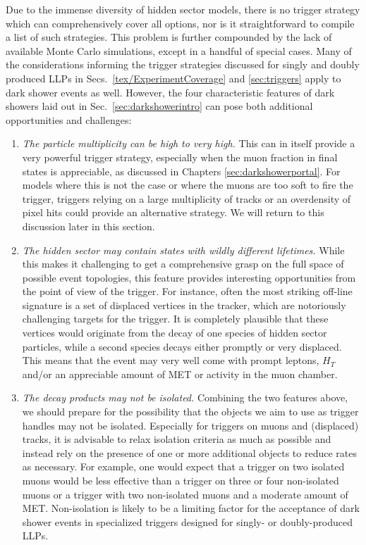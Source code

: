 Due to the immense diversity of hidden sector models, there is no trigger strategy which can comprehensively cover all options, nor is it straightforward to compile a list of such strategies. This problem is further compounded by the lack of available Monte Carlo simulations, except in a handful of special cases. 
Many of the considerations informing the trigger strategies discussed for singly and doubly produced LLPs in Secs.~\ref{tex/ExperimentCoverage} and \ref{sec:triggers}  apply to dark shower events as well.  However, the four characteristic features of dark showers laid out in Sec.~\ref{sec:darkshowerintro} can pose both additional opportunities and challenges:
\begin{enumerate}
\item \emph{The particle multiplicity can be high to very high.} This can in itself provide a very powerful trigger strategy, especially when the muon fraction in final states is appreciable, as discussed in Chapters \ref{sec:darkshowerportal}. For models where this is not the case or where the muons are too soft to fire the trigger, triggers relying on a large multiplicity of tracks or an overdensity of pixel hits could provide an alternative strategy. We will return to this discussion later in this section.

\item \emph{The hidden sector may contain states with wildly different lifetimes.} While this makes it  challenging to get a comprehensive grasp on the full space of possible event topologies, this feature provides interesting opportunities from the point of view of the trigger. For instance, often the most striking off-line signature is a set of displaced vertices in the tracker, which are notoriously challenging targets for the trigger. It is completely plausible that these vertices would originate from the decay of one species of hidden sector particles, while a second species decays either promptly or very displaced. This means that the event may very well come with prompt leptons, $H_T$ and/or an appreciable amount of MET or activity in the muon chamber.

\item \emph{The decay products may not be isolated.} Combining the two features above, we should prepare for the possibility that the objects we aim to use as trigger handles may not be isolated.  Especially for triggers on muons and (displaced) tracks, it is advisable to relax  isolation criteria as much as possible and instead rely on the presence of one or more additional objects to reduce rates as necessary. For example, one would expect that a trigger on two isolated muons would be less effective than a trigger on three or four non-isolated muons or a trigger with two non-isolated muons and a moderate amount of MET.  Non-isolation is likely to be a limiting factor for the acceptance of dark shower events in specialized triggers designed for singly- or doubly-produced LLPs. 


\end{enumerate}
